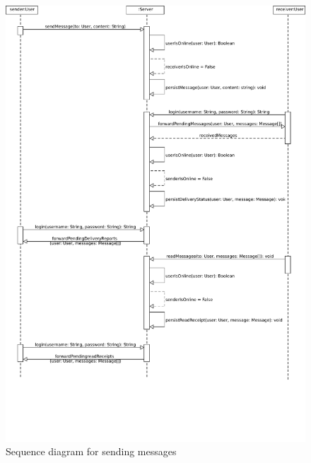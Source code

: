 \begin{figure}[h]
    \centering
    \includegraphics[width=1.0\textwidth]{./graphics/sequenceDiagramMessage}
    \caption{Sequence diagram for sending messages}
    \label{fig:sequenceDiagramMessage}
\end{figure}

